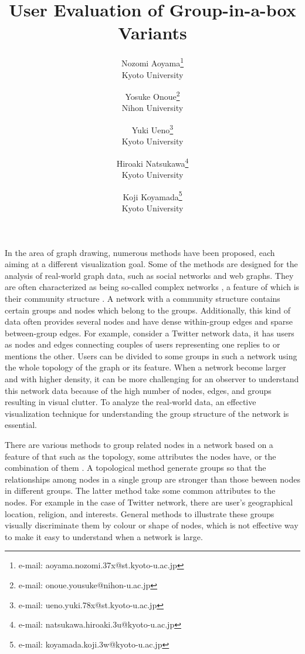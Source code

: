 \documentclass{vgtc}                          %
\title{User Evaluation of Group-in-a-box Variants}
\author{Nozomi Aoyama\thanks{e-mail: aoyama.nozomi.37x@st.kyoto-u.ac.jp}\\ %
        \scriptsize Kyoto University %
\and Yosuke Onoue\thanks{e-mail: onoue.yousuke@nihon-u.ac.jp}\\ %
     \scriptsize Nihon University %
\and Yuki Ueno\thanks{e-mail: ueno.yuki.78x@st.kyoto-u.ac.jp}\\ %
     \scriptsize \centering Kyoto University
\and Hiroaki Natsukawa\thanks{e-mail: natsukawa.hiroaki.3u@kyoto-u.ac.jp}\\ %
     \scriptsize Kyoto University
\and Koji Koyamada\thanks{e-mail: koyamada.koji.3w@kyoto-u.ac.jp}\\ %
     \scriptsize Kyoto University}
\begin{document}


\maketitle

In the area of graph drawing, numerous methods have been proposed, each aiming at a different visualization goal.
Some of the methods are designed for the analysis of real-world graph data, such as social networks and web graphs.
They are often characterized as being so-called complex networks \cite{Newman:2010:NI:1809753}, a feature of which is their community structure \cite{girvan2002community,newman2004detecting}.
A network with a community structure contains certain groups and nodes which belong to the groups.
Additionally, this kind of data often provides several nodes and have dense within-group edges and sparse between-group edges.
For example, consider a Twitter network data, it has users as nodes and edges connecting couples of users representing one replies to or mentions the other.
Users can be divided to some groups in such a network using the whole topology of the graph or its feature.
When a network become larger and with higher density, it can be more challenging for an observer to understand this network data because of the high number of nodes, edges, and groups resulting in visual clutter.
To analyze the real-world data, an effective visualization technique for understanding the group structure of the network is essential.

There are various methods to group related nodes in a network based on a feature of that such as the topology, some attributes the nodes have, or the combination of them \cite{clauset2004finding,wakita2007finding,lloyd1982least,navlakha2009finding}.
A topological method generate groups so that the relationships among nodes in a single group are stronger than those beween nodes in different groups.
The latter method take some common attributes to the nodes. For example in the case of Twitter network, there are user's geographical location, religion, and interests.
General methods to illustrate these groups visually discriminate them by colour or shape of nodes, which is not effective way to make it easy to understand when a network is large.
\end{document}
